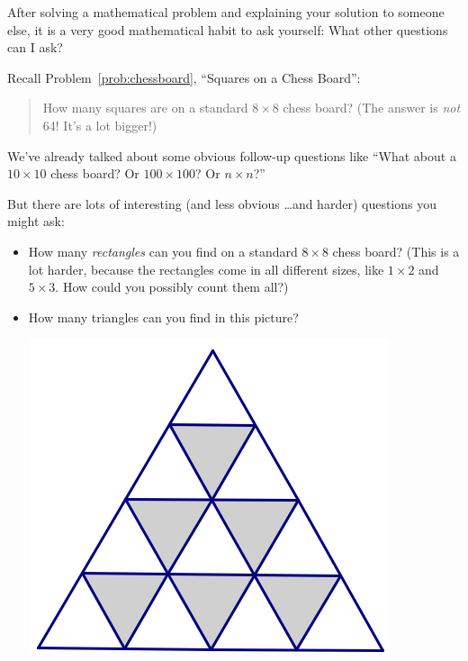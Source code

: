After solving a mathematical problem and explaining your solution to someone else, it is a very good mathematical habit to ask yourself: What other questions can I ask?

\begin{example}
Recall Problem~\ref{prob:chessboard}, ``Squares on a Chess Board'':

\begin{quote}
How many squares are on a standard $8 \times 8$ chess board?  (The answer is \emph{not} 64!  It's a lot bigger!)
\end{quote}

We've already talked about some obvious follow-up questions like ``What about a $10 \times 10$ chess board?  Or $100 \times 100$?  Or $n \times n$?''

But there are lots of interesting (and less obvious \dots and harder) questions you might ask:
\begin{itemize}
\item
How many \emph{rectangles} can you find on a standard $8 \times 8$ chess board?  (This is a lot harder, because the rectangles come in all different sizes, like $1 \times 2$ and $5 \times 3$.  How could you possibly count them all?)
\item
How many triangles can you find in this picture?
\begin{center}
\includegraphics[height=4 cm]{../Pictures/ProbSolvingPics/triangleboard}
\end{center}

\end{itemize}

\end{example}

